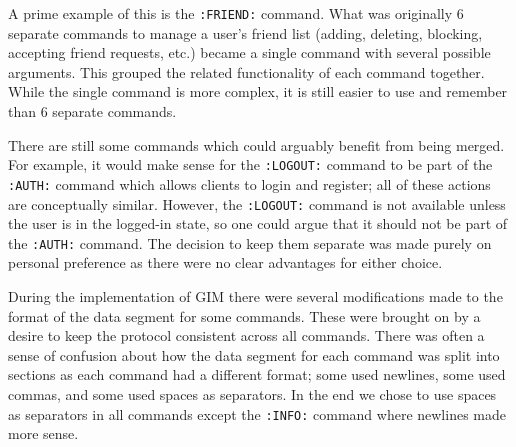 A prime example of this is the \texttt{:FRIEND:} command. What was originally 6 separate commands to manage a user's friend list (adding, deleting, blocking, accepting friend requests, etc.) became a single command with several possible arguments. This grouped the related functionality of each command together. While the single command is more complex, it is still easier to use and remember than 6 separate commands.

There are still some commands which could arguably benefit from being merged. For example, it would make sense for the \texttt{:LOGOUT:} command to be part of the \texttt{:AUTH:} command which allows clients to login and register; all of these actions are conceptually similar. However, the \texttt{:LOGOUT:} command is not available unless the user is in the logged-in state, so one could argue that it should not be part of the \texttt{:AUTH:} command. The decision to keep them separate was made purely on personal preference as there were no clear advantages for either choice. %

During the implementation of GIM there were several modifications made to the format of the data segment for some commands. These were brought on by a desire to keep the protocol consistent across all commands. There was often a sense of confusion about how the data segment for each command was split into sections as each command had a different format; some used newlines, some used commas, and some used spaces as separators. In the end we chose to use spaces as separators in all commands except the \texttt{:INFO:} command where newlines made more sense. %


